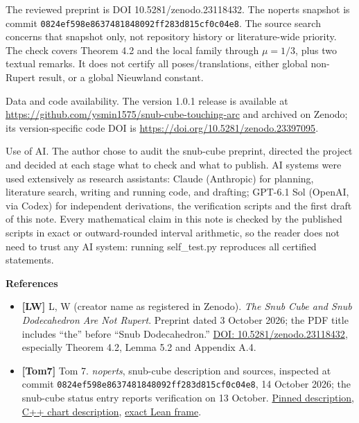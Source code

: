 \documentclass[
  10pt,
  a4paper,
]{article}
\providecommand{\tightlist}{%
  \setlength{\itemsep}{0pt}\setlength{\parskip}{0pt}}
\begin{document}
The reviewed preprint is DOI 10.5281/zenodo.23118432. The noperts snapshot
is commit \texttt{0824ef59\allowbreak{}8e863748\allowbreak{}1848092f\allowbreak{}f283d815\allowbreak{}cf0c04e8}.
The source search concerns that snapshot only, not repository history or
literature-wide priority. The check covers Theorem 4.2 and the local family
through $\mu=1/3$, plus two textual remarks. It does not certify all
poses/translations, either global non-Rupert result, or a global Nieuwland
constant.

Data and code availability. The version 1.0.1 release is available at
\url{https://github.com/ysmin1575/snub-cube-touching-arc}
and archived on Zenodo; its version-specific code DOI is
\url{https://doi.org/10.5281/zenodo.23397095}.

Use of AI. The author chose to audit the snub-cube preprint, directed the project and decided at each stage what to check and what to publish. AI systems were used extensively as research assistants: Claude (Anthropic) for planning, literature search, writing and running code, and drafting; GPT-6.1 Sol (OpenAI, via Codex) for independent derivations, the verification scripts and the first draft of this note. Every mathematical claim in this note is checked by the published scripts in exact or outward-rounded interval arithmetic, so the reader does not need to trust any AI system: running self\_test.py reproduces all certified statements.

\small


\textbf{References}

\begin{itemize}
\tightlist
\item
  \textbf{{[}LW{]}} L, W (creator name as registered in Zenodo).
  \emph{The Snub Cube and Snub Dodecahedron Are Not Rupert}. Preprint
  dated 3 October 2026; the PDF title includes ``the'' before ``Snub
  Dodecahedron.'' \href{https://doi.org/10.5281/zenodo.23118432}{DOI:
  10.5281/zenodo.23118432}, especially Theorem 4.2, Lemma 5.2 and
  Appendix A.4.
\item
  \textbf{{[}Tom7{]}} Tom 7. \emph{noperts}, snub-cube description and
  sources, inspected at commit
  \texttt{0824ef59\allowbreak{}8e863748\allowbreak{}1848092f\allowbreak{}f283d815\allowbreak{}cf0c04e8}, 14 October 2026;
  the snub-cube status entry reports verification on 13 October.
  \href{https://github.com/tom7/noperts/blob/0824ef598e8637481848092ff283d815cf0c04e8/snub-cube.md\#L53-L60}{Pinned
  description},
  \href{https://github.com/tom7/noperts/blob/0824ef598e8637481848092ff283d815cf0c04e8/search/sc/sccapcert.cc\#L6-L26}{C++
  chart description},
  \href{https://github.com/tom7/noperts/blob/0824ef598e8637481848092ff283d815cf0c04e8/proof/SnubCube/Caps.lean\#L35-L64}{exact
  Lean frame}.
\end{itemize}
\end{document}
